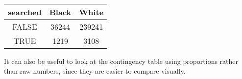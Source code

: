 \documentclass[]{book}
\newenvironment{Shaded}{\begin{snugshade}}{\end{snugshade}}
\newcommand{\KeywordTok}[1]{\textcolor[rgb]{0.13,0.29,0.53}{\textbf{#1}}}
\newcommand{\DataTypeTok}[1]{\textcolor[rgb]{0.13,0.29,0.53}{#1}}
\newcommand{\DecValTok}[1]{\textcolor[rgb]{0.00,0.00,0.81}{#1}}
\newcommand{\StringTok}[1]{\textcolor[rgb]{0.31,0.60,0.02}{#1}}
\newcommand{\CommentTok}[1]{\textcolor[rgb]{0.56,0.35,0.01}{\textit{#1}}}
\newcommand{\OperatorTok}[1]{\textcolor[rgb]{0.81,0.36,0.00}{\textbf{#1}}}
\newcommand{\NormalTok}[1]{#1}
\theoremstyle{definition}
\theoremstyle{definition}
\theoremstyle{definition}
\theoremstyle{remark}
\begin{document}
\begin{longtable}[]{@{}ccc@{}}
\toprule
\begin{minipage}[b]{0.14\columnwidth}\centering\strut
searched\strut
\end{minipage} & \begin{minipage}[b]{0.10\columnwidth}\centering\strut
Black\strut
\end{minipage} & \begin{minipage}[b]{0.10\columnwidth}\centering\strut
White\strut
\end{minipage}\tabularnewline
\midrule
\endhead
\begin{minipage}[t]{0.14\columnwidth}\centering\strut
FALSE\strut
\end{minipage} & \begin{minipage}[t]{0.10\columnwidth}\centering\strut
36244\strut
\end{minipage} & \begin{minipage}[t]{0.10\columnwidth}\centering\strut
239241\strut
\end{minipage}\tabularnewline
\begin{minipage}[t]{0.14\columnwidth}\centering\strut
TRUE\strut
\end{minipage} & \begin{minipage}[t]{0.10\columnwidth}\centering\strut
1219\strut
\end{minipage} & \begin{minipage}[t]{0.10\columnwidth}\centering\strut
3108\strut
\end{minipage}\tabularnewline
\bottomrule
\end{longtable}

It can also be useful to look at the contingency table using proportions
rather than raw numbers, since they are easier to compare visually.

\begin{Shaded}
\end{Shaded}
\end{document}
